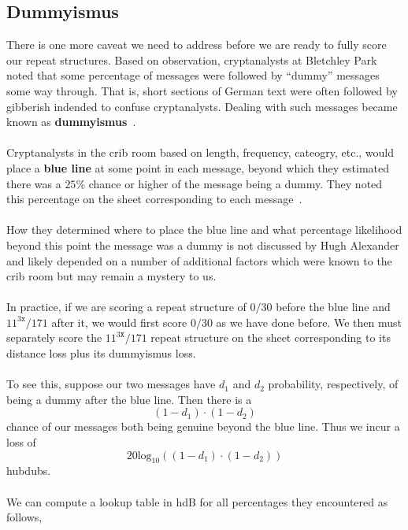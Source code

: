 \subsection{Dummyismus}
There is one more caveat we need to address before we are ready to
fully score our repeat structures. Based on observation,
cryptanalysts at Bletchley Park noted that some percentage of
messages were followed by ``dummy'' messages some way through. That is,
short sections of German text were often followed by gibberish indended to confuse cryptanalysts. Dealing with
such messages became known as {\bf{dummyismus}}~\cite[Section 4.4]{Hosgood2007}.
\\\\Cryptanalysts in the crib room  based on length, frequency,
cateogry, etc., would place a {\bf{blue line}} at some point in
each message, beyond which they estimated there was a $25\%$ chance
or higher of the message being a dummy. They noted this
percentage on the sheet corresponding to each message~\cite[p.~104]{Alexander1945}.
\\\\How they determined where to place the blue line and what
percentage likelihood beyond this point the message was a dummy is
not discussed by Hugh Alexander and likely depended on a number of
additional factors which were known to the crib room but may remain
a mystery to us.
\\\\In practice, if we are scoring a repeat structure of $0/30$
before the blue line and $11^{3\texttt{x}}/171$ after it, we would
first score $0/30$ as we have done before. We then must separately score the
$11^{3\texttt{X}}/171$ repeat structure on the sheet corresponding to
its distance
loss plus its dummyismus loss.
\\\\To see this, suppose our two messages have $d_1$ and $d_2$
probability, respectively, of being a dummy after the blue line. Then there is a
\[
  (1-d_1)\cdot(1-d_2)
\]
chance of our messages both being genuine beyond the blue line. Thus
we incur a loss of
\[
  20\text{log}_{10}((1-d_1)\cdot(1-d_2))
\]
hubdubs.
\\\\We can compute a lookup table in hdB for all percentages they
encountered as follows,

